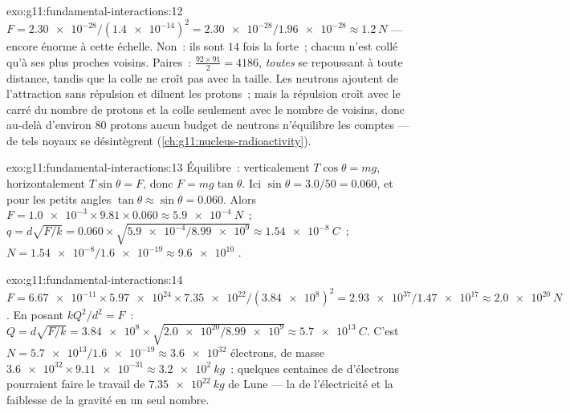 \begin{solution}{exo:g11:fundamental-interactions:12}
$F = \num{2.30e-28}/(\num{1.4e-14})^2 = \num{2.30e-28}/\num{1.96e-28}
\approx \qty{1.2}{N}$ --- encore énorme à cette échelle. Non~: ils sont
$14$ fois la  forte~; chacun n'est
collé qu'à ses plus proches voisins. Paires~:
$\frac{92 \times 91}{2} = 4186$, \emph{toutes} se repoussant à toute
distance, tandis que la colle ne croît pas avec la taille. Les neutrons
ajoutent de l'attraction sans répulsion et diluent les protons~; mais
la répulsion croît avec le carré du nombre de protons et la colle
seulement avec le nombre de voisins, donc au-delà d'environ $80$ protons
aucun budget de neutrons n'équilibre les comptes --- de tels noyaux se
désintègrent (\cref{ch:g11:nucleus-radioactivity}).
\end{solution}

\begin{solution}{exo:g11:fundamental-interactions:13}
Équilibre~: verticalement
$T\cos\theta = mg$, horizontalement $T\sin\theta = F$, donc
$F = mg\tan\theta$. Ici $\sin\theta = 3.0/50 = 0.060$, et pour les
petits angles $\tan\theta \approx \sin\theta = 0.060$. Alors
$F = \num{1.0e-3} \times 9.81 \times 0.060 \approx \qty{5.9e-4}{N}$~;
$q = d\sqrt{F/k} = 0.060 \times \sqrt{\num{5.9e-4}/\num{8.99e9}}
\approx \qty{1.54e-8}{C}$~; $N = \num{1.54e-8}/\num{1.6e-19} \approx
\num{9.6e10}$ .
\end{solution}

\begin{solution}{exo:g11:fundamental-interactions:14}
$F = \num{6.67e-11} \times \num{5.97e24} \times \num{7.35e22} /
(\num{3.84e8})^2 = \num{2.93e37}/\num{1.47e17} \approx \qty{2.0e20}{N}$.
En posant $kQ^2/d^2 = F$~:
$Q = d\sqrt{F/k} = \num{3.84e8} \times \sqrt{\num{2.0e20}/\num{8.99e9}}
\approx \qty{5.7e13}{C}$. C'est
$N = \num{5.7e13}/\num{1.6e-19} \approx \num{3.6e32}$ électrons, de
masse $\num{3.6e32} \times \num{9.11e-31} \approx \qty{3.2e2}{kg}$~:
quelques centaines de 
d'électrons pourraient faire le travail de $\qty{7.35e22}{kg}$ de Lune ---
la  de l'électricité et la faiblesse de la gravité en un seul
nombre.
\end{solution}

